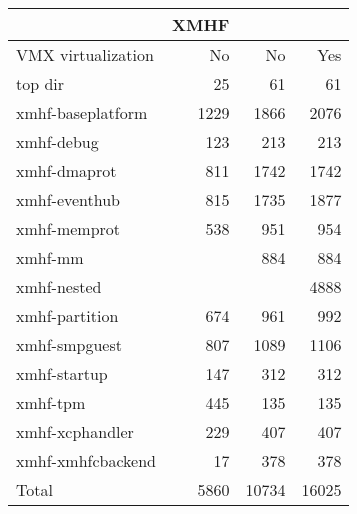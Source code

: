 \documentclass{standalone}
\begin{document}
%

\begin{tabular}{ l | r | r | r }\hline
 & XMHF & \XMHF64 & \XMHF64 \\ \hline
VMX virtualization & No & No & Yes \\ \hline
top dir & 25 & 61 & 61 \\
xmhf-baseplatform & 1229 & 1866 & 2076 \\
xmhf-debug & 123 & 213 & 213 \\
xmhf-dmaprot & 811 & 1742 & 1742 \\
xmhf-eventhub & 815 & 1735 & 1877 \\
xmhf-memprot & 538 & 951 & 954 \\
xmhf-mm &  & 884 & 884 \\
xmhf-nested &  &  & 4888 \\
xmhf-partition & 674 & 961 & 992 \\
xmhf-smpguest & 807 & 1089 & 1106 \\
xmhf-startup & 147 & 312 & 312 \\
xmhf-tpm & 445 & 135 & 135 \\
xmhf-xcphandler & 229 & 407 & 407 \\
xmhf-xmhfcbackend & 17 & 378 & 378 \\ \hline
Total & 5860 & 10734 & 16025 \\
\end{tabular}
\end{document}
